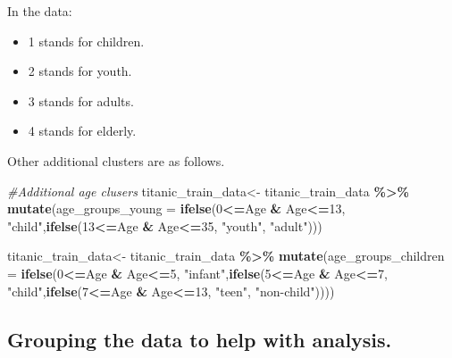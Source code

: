 \documentclass[
]{article}
\newenvironment{Shaded}{\begin{snugshade}}{\end{snugshade}}
\newcommand{\AttributeTok}[1]{\textcolor[rgb]{0.13,0.29,0.53}{#1}}
\newcommand{\CommentTok}[1]{\textcolor[rgb]{0.56,0.35,0.01}{\textit{#1}}}
\newcommand{\DecValTok}[1]{\textcolor[rgb]{0.00,0.00,0.81}{#1}}
\newcommand{\FunctionTok}[1]{\textcolor[rgb]{0.13,0.29,0.53}{\textbf{#1}}}
\newcommand{\NormalTok}[1]{#1}
\newcommand{\OtherTok}[1]{\textcolor[rgb]{0.56,0.35,0.01}{#1}}
\newcommand{\SpecialCharTok}[1]{\textcolor[rgb]{0.81,0.36,0.00}{\textbf{#1}}}
\newcommand{\StringTok}[1]{\textcolor[rgb]{0.31,0.60,0.02}{#1}}
\providecommand{\tightlist}{%
  \setlength{\itemsep}{0pt}\setlength{\parskip}{0pt}}
\begin{document}
In the data:

\begin{itemize}
\tightlist
\item
  1 stands for children.
\item
  2 stands for youth.
\item
  3 stands for adults.
\item
  4 stands for elderly.
\end{itemize}

Other additional clusters are as follows.

\begin{Shaded}
\begin{Highlighting}[]
\CommentTok{\#Additional age clusers}
\NormalTok{titanic\_train\_data}\OtherTok{\textless{}{-}}\NormalTok{ titanic\_train\_data }\SpecialCharTok{\%\textgreater{}\%}
  \FunctionTok{mutate}\NormalTok{(}\AttributeTok{age\_groups\_young =} \FunctionTok{ifelse}\NormalTok{(}\DecValTok{0}\SpecialCharTok{\textless{}=}\NormalTok{Age }\SpecialCharTok{\&}\NormalTok{ Age}\SpecialCharTok{\textless{}=}\DecValTok{13}\NormalTok{, }\StringTok{"child"}\NormalTok{,}\FunctionTok{ifelse}\NormalTok{(}\DecValTok{13}\SpecialCharTok{\textless{}=}\NormalTok{Age }\SpecialCharTok{\&}\NormalTok{ Age}\SpecialCharTok{\textless{}=}\DecValTok{35}\NormalTok{, }\StringTok{"youth"}\NormalTok{, }\StringTok{"adult"}\NormalTok{)))}

\NormalTok{titanic\_train\_data}\OtherTok{\textless{}{-}}\NormalTok{ titanic\_train\_data }\SpecialCharTok{\%\textgreater{}\%}
  \FunctionTok{mutate}\NormalTok{(}\AttributeTok{age\_groups\_children =} \FunctionTok{ifelse}\NormalTok{(}\DecValTok{0}\SpecialCharTok{\textless{}=}\NormalTok{Age }\SpecialCharTok{\&}\NormalTok{ Age}\SpecialCharTok{\textless{}=}\DecValTok{5}\NormalTok{, }\StringTok{"infant"}\NormalTok{,}\FunctionTok{ifelse}\NormalTok{(}\DecValTok{5}\SpecialCharTok{\textless{}=}\NormalTok{Age }\SpecialCharTok{\&}\NormalTok{ Age}\SpecialCharTok{\textless{}=}\DecValTok{7}\NormalTok{, }\StringTok{"child"}\NormalTok{,}\FunctionTok{ifelse}\NormalTok{(}\DecValTok{7}\SpecialCharTok{\textless{}=}\NormalTok{Age }\SpecialCharTok{\&}\NormalTok{ Age}\SpecialCharTok{\textless{}=}\DecValTok{13}\NormalTok{, }\StringTok{"teen"}\NormalTok{, }\StringTok{"non{-}child"}\NormalTok{))))}
\end{Highlighting}
\end{Shaded}

\hypertarget{grouping-the-data-to-help-with-analysis.}{%
\subsection{Grouping the data to help with
analysis.}\label{grouping-the-data-to-help-with-analysis.}}
\end{document}
